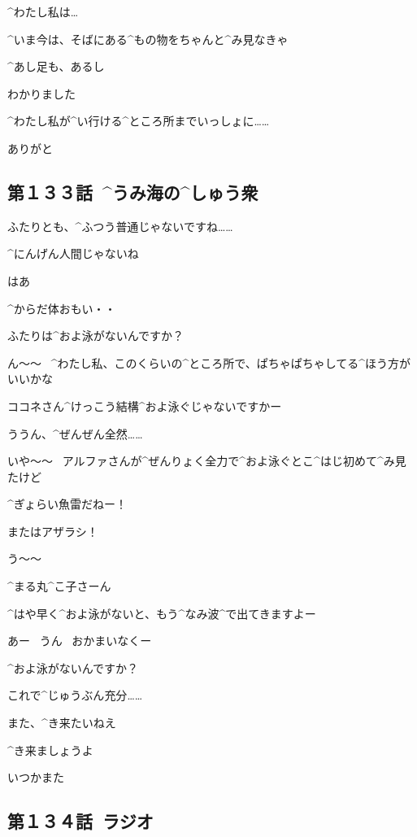 \Sensei ^{わたし}{私}は…

\Sensei ^{いま}{今}は、そばにある^{もの}{物}をちゃんと^{み}{見}なきゃ

\page
\Sensei ^{あし}{足}も、あるし

\Alpha わかりました

\Alpha ^{わたし}{私}が^{い}{行}ける^{ところ}{所}までいっしょに……

\Sensei ありがと


\subsection{第１３３話\ ^{うみ}{海}の^{しゅう}{衆}}

\page[36]
\Kokone ふたりとも、^{ふつう}{普通}じゃないですね……

\Maruko ^{にんげん}{人間}じゃないね

\page
\Alpha はあ

\Alpha ^{からだ}{体}おもい・・

\Makki ふたりは^{およ}{泳}がないんですか？

\Kokone ん〜〜
\ ^{わたし}{私}、このくらいの^{ところ}{所}で、ぱちゃぱちゃしてる^{ほう}{方}がいいかな

\Makki ココネさん^{けっこう}{結構}^{およ}{泳}ぐじゃないですかー

\Kokone ううん、^{ぜんぜん}{全然}……

\Makki いや〜〜
\ アルファさんが^{ぜんりょく}{全力}で^{およ}{泳}ぐとこ^{はじ}{初}めて^{み}{見}たけど

\Makki ^{ぎょらい}{魚雷}だねー！

\page
\Makki またはアザラシ！

\Kokone う〜〜

\Makki ^{まる}{丸}^{こ}{子}さーん

\Makki ^{はや}{早}く^{およ}{泳}がないと、もう^{なみ}{波}^{で}{出}てきますよー

\Maruko あー
\ うん
\ おかまいなくー

\page
\Makki ^{およ}{泳}がないんですか？

\Maruko これで^{じゅうぶん}{充分}……

\page
\Maruko また、^{き}{来}たいねえ

\Makki ^{き}{来}ましょうよ

\Makki いつかまた


\subsection{第１３４話\ ラジオ}

